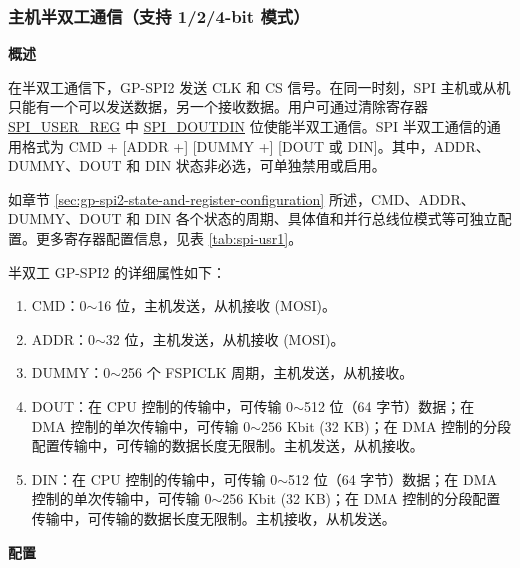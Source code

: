 \documentclass[main\_\_CN.tex]{subfiles}
\begin{document}
\subsubsection{主机半双工通信（支持 1/2/4-bit 模式）}
\label{sec:gp-spi2-1/2/8-bits}

\textbf{概述}

在半双工通信下，GP-SPI2 发送 CLK 和 CS 信号。在同一时刻，SPI 主机或从机只能有一个可以发送数据，另一个接收数据。用户可通过清除寄存器 \hyperref[regdesc:SPIUSERREG]{SPI\_USER\_REG} 中 \hyperref[fielddesc:SPIDOUTDIN]{SPI\_DOUTDIN} 位使能半双工通信。SPI 半双工通信的通用格式为 CMD + [ADDR +] [DUMMY +] [DOUT 或 DIN]。其中，ADDR、DUMMY、DOUT 和 DIN 状态非必选，可单独禁用或启用。

如章节 \ref{sec:gp-spi2-state-and-register-configuration} 所述，CMD、ADDR、DUMMY、DOUT 和 DIN 各个状态的周期、具体值和并行总线位模式等可独立配置。更多寄存器配置信息，见表 \ref{tab:spi-usr1}。

半双工 GP-SPI2 的详细属性如下：

\begin{enumerate}
    \item CMD：0$\sim$16 位，主机发送，从机接收 (MOSI)。
    \item ADDR：0$\sim$32 位，主机发送，从机接收 (MOSI)。
    \item DUMMY：0$\sim$256 个 FSPICLK 周期，主机发送，从机接收。
    \item DOUT：在 CPU 控制的传输中，可传输 0$\sim$512 位（64 字节）数据；在 DMA 控制的单次传输中，可传输 0$\sim$256 Kbit (32 KB)；在 DMA 控制的分段配置传输中，可传输的数据长度无限制。主机发送，从机接收。
   
    \item DIN：在 CPU 控制的传输中，可传输 0$\sim$512 位（64 字节）数据；在 DMA 控制的单次传输中，可传输 0$\sim$256 Kbit (32 KB)；在 DMA 控制的分段配置传输中，可传输的数据长度无限制。主机接收，从机发送。
\end{enumerate}

\textbf{配置}
\end{document}
